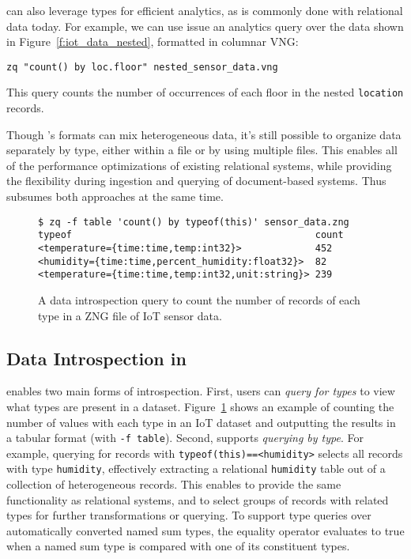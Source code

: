 \sys{} can also leverage types for efficient analytics, as is commonly done with relational data today. For example, we can use issue an analytics query over the data shown in Figure~\ref{f:iot_data_nested}, formatted in columnar VNG:

\texttt{zq "count() by loc.floor" nested\_sensor\_data.vng}

\noindent{}This query counts the number of occurrences of each floor in the nested \texttt{location} records.

Though \sys{}'s formats can mix heterogeneous data, it's still possible to organize data separately by type, either within a file or by using multiple files. This enables all of the performance optimizations of existing relational systems, while providing the flexibility during ingestion and querying of document-based systems. Thus \sys{} subsumes both approaches at the same time.



\begin{figure}
    \begin{verbatim}
$ zq -f table 'count() by typeof(this)' sensor_data.zng
typeof                                           count
<temperature={time:time,temp:int32}>             452
<humidity={time:time,percent_humidity:float32}>  82
<temperature={time:time,temp:int32,unit:string}> 239
    \end{verbatim}
    \vspace{-1.3em}
    \caption{A data introspection query to count the number of records of each type in a ZNG file of IoT sensor data. }
    \label{f:count_by_type}
    \vspace{-1.5em}
\end{figure}

\vspace{-0.9em}
\subsection{Data Introspection in \sys{}} \label{ss:zed_in_action_types}

\sys{} enables two main forms of introspection. First, users can {\em query for types} to view what types are present in a dataset. Figure~\ref{f:count_by_type} shows an example of counting the number of values with each type in an IoT dataset and outputting the results in a tabular format (with \texttt{-f table}). Second, \sys{} supports {\em querying by type}. For example, querying for records with \texttt{typeof(this)==<humidity>} selects all records with type \texttt{humidity}, effectively extracting a relational \texttt{humidity} table out of a collection of heterogeneous records.
This enables \sys{} to provide the same functionality as relational systems, and to select groups of records with related types for further transformations or querying. To support type queries over automatically converted named sum types, the equality operator evaluates to true when a named sum type is compared with one of its constituent types.

